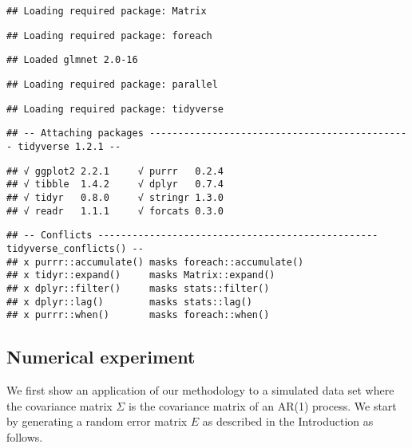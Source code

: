 \documentclass[]{article}
\begin{document}
\begin{verbatim}
## Loading required package: Matrix
\end{verbatim}

\begin{verbatim}
## Loading required package: foreach
\end{verbatim}

\begin{verbatim}
## Loaded glmnet 2.0-16
\end{verbatim}

\begin{verbatim}
## Loading required package: parallel
\end{verbatim}

\begin{verbatim}
## Loading required package: tidyverse
\end{verbatim}

\begin{verbatim}
## -- Attaching packages ---------------------------------------------- tidyverse 1.2.1 --
\end{verbatim}

\begin{verbatim}
## √ ggplot2 2.2.1     √ purrr   0.2.4
## √ tibble  1.4.2     √ dplyr   0.7.4
## √ tidyr   0.8.0     √ stringr 1.3.0
## √ readr   1.1.1     √ forcats 0.3.0
\end{verbatim}

\begin{verbatim}
## -- Conflicts ------------------------------------------------- tidyverse_conflicts() --
## x purrr::accumulate() masks foreach::accumulate()
## x tidyr::expand()     masks Matrix::expand()
## x dplyr::filter()     masks stats::filter()
## x dplyr::lag()        masks stats::lag()
## x purrr::when()       masks foreach::when()
\end{verbatim}

\subsection{Numerical experiment}\label{numerical-experiment}

We first show an application of our methodology to a simulated data set
where the covariance matrix \(\Sigma\) is the covariance matrix of an
AR(1) process. We start by generating a random error matrix \(E\) as
described in the Introduction as follows.
\end{document}
